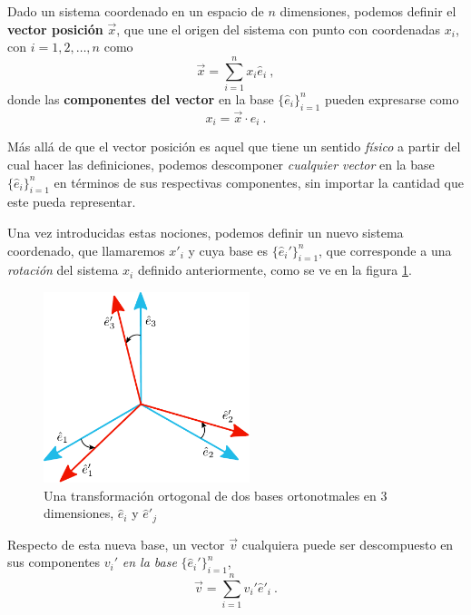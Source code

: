 \begin{defi} 
    Dado un sistema coordenado en un espacio de $n$ dimensiones, podemos definir el \textbf{vector posición} $\vec{x}$, que une el origen del sistema con punto con coordenadas $x_i$, con $i = 1, 2, \dots, n$ como
\begin{equation} \label{eq:vector-posicion}
    \vec{x} = \sum_{i=1}^n x_i \hat{e}_i \ ,
\end{equation}
donde las \textbf{componentes del vector} en la base $\{ \hat{e}_i\}_{i=1}^n$ pueden expresarse como
\begin{equation}
    x_i = \vec{x} \cdot \hat{e}_i \ .
\end{equation}
\end{defi}

Más allá de que el vector posición es aquel que tiene un sentido \emph{físico} a partir del cual hacer las definiciones, podemos descomponer \emph{cualquier vector} en la base $\{ \hat{e}_i\}_{i=1}^n$ en términos de sus respectivas componentes, sin importar la cantidad que este pueda representar.

Una vez introducidas estas nociones, podemos definir un nuevo sistema coordenado, que llamaremos $x'_i$ y cuya base es $\{ \hat{e}_i'\}_{i=1}^n$, que corresponde a una \emph{rotación} del sistema $x_i$ definido anteriormente, como se ve en la figura \ref{fig:bases-ortonormales}.

\begin{figure}[htbp]
    \centering
    \includegraphics[width=6cm]{Figuras/fig-rotacion-bases.pdf}
    \caption{Una transformación ortogonal de dos bases ortonotmales en 3 dimensiones, $\hat{e}_i$ y $\hat{e}'_j$}
    \label{fig:bases-ortonormales}
\end{figure}

Respecto de esta nueva base, un vector $\vec{v}$ cualquiera puede ser descompuesto en sus componentes $v_i'$ \emph{en la base} $\{ \hat{e}_i'\}_{i=1}^n$,
\begin{equation}
    \vec{v} = \sum_{i=1}^n v_i' \hat{e}'_i \ .
\end{equation}

